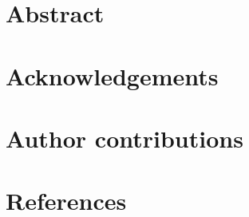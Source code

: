\documentclass[9pt, twocolumn, lineno]{templates/pi/pi-article}
\begin{document}


\section{Abstract}




\section*{Acknowledgements}


\section*{Author contributions}




\section{References}


\end{document}
